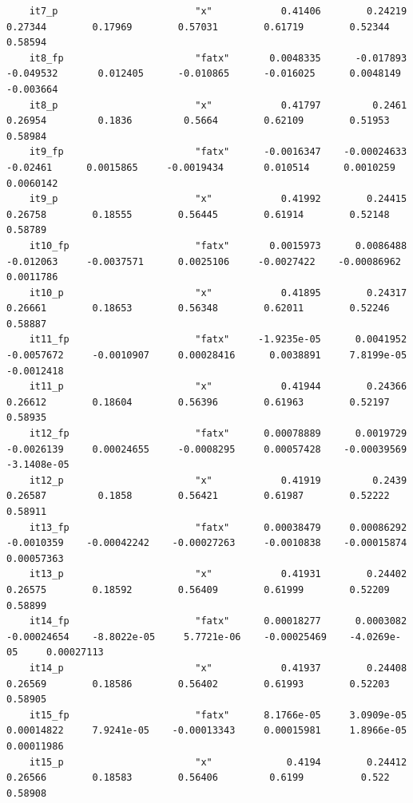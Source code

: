 \documentclass[
]{book}
\begin{document}
\begin{verbatim}
    it7_p                        "x"            0.41406        0.24219        0.27344        0.17969        0.57031        0.61719        0.52344        0.58594
    it8_fp                       "fatx"       0.0048335      -0.017893      -0.049532       0.012405      -0.010865      -0.016025      0.0048149      -0.003664
    it8_p                        "x"            0.41797         0.2461        0.26954         0.1836         0.5664        0.62109        0.51953        0.58984
    it9_fp                       "fatx"      -0.0016347    -0.00024633       -0.02461      0.0015865     -0.0019434       0.010514      0.0010259      0.0060142
    it9_p                        "x"            0.41992        0.24415        0.26758        0.18555        0.56445        0.61914        0.52148        0.58789
    it10_fp                      "fatx"       0.0015973      0.0086488      -0.012063     -0.0037571      0.0025106     -0.0027422    -0.00086962      0.0011786
    it10_p                       "x"            0.41895        0.24317        0.26661        0.18653        0.56348        0.62011        0.52246        0.58887
    it11_fp                      "fatx"     -1.9235e-05      0.0041952     -0.0057672     -0.0010907     0.00028416      0.0038891     7.8199e-05     -0.0012418
    it11_p                       "x"            0.41944        0.24366        0.26612        0.18604        0.56396        0.61963        0.52197        0.58935
    it12_fp                      "fatx"      0.00078889      0.0019729     -0.0026139     0.00024655     -0.0008295     0.00057428    -0.00039569    -3.1408e-05
    it12_p                       "x"            0.41919         0.2439        0.26587         0.1858        0.56421        0.61987        0.52222        0.58911
    it13_fp                      "fatx"      0.00038479     0.00086292     -0.0010359    -0.00042242    -0.00027263     -0.0010838    -0.00015874     0.00057363
    it13_p                       "x"            0.41931        0.24402        0.26575        0.18592        0.56409        0.61999        0.52209        0.58899
    it14_fp                      "fatx"      0.00018277      0.0003082    -0.00024654    -8.8022e-05     5.7721e-06    -0.00025469    -4.0269e-05     0.00027113
    it14_p                       "x"            0.41937        0.24408        0.26569        0.18586        0.56402        0.61993        0.52203        0.58905
    it15_fp                      "fatx"      8.1766e-05     3.0909e-05     0.00014822     7.9241e-05    -0.00013343     0.00015981     1.8966e-05     0.00011986
    it15_p                       "x"             0.4194        0.24412        0.26566        0.18583        0.56406         0.6199          0.522        0.58908

\end{verbatim}
\end{document}
